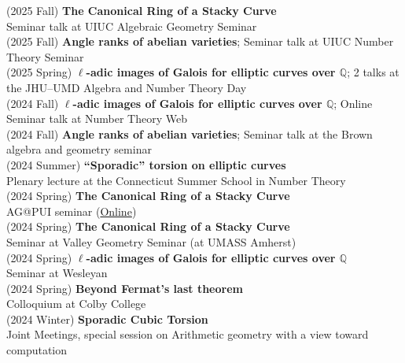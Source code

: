 \documentclass[margin,line]{res}
\begin{document}
\begin{resume}
(2025 Fall) \textbf{The Canonical Ring of a Stacky Curve}\\
Seminar talk at UIUC Algebraic Geometry Seminar
\vspace{.05cm}\\    
(2025 Fall) \textbf{Angle ranks of abelian varieties};
Seminar talk at UIUC Number Theory Seminar
\vspace{.05cm}\\
(2025 Spring) \textbf{$\ell$-adic images of Galois for elliptic curves over $\mathbb{Q}$};
2 talks at the JHU–UMD Algebra and Number Theory Day
\vspace{.05cm}\\  
(2024 Fall) \textbf{$\ell$-adic images of Galois for elliptic curves over $\mathbb{Q}$};
Online Seminar talk at Number Theory Web
\vspace{.05cm}\\  
(2024 Fall) \textbf{Angle ranks of abelian varieties};
Seminar talk at the Brown algebra and geometry seminar
\vspace{.05cm}\\
  (2024 Summer) \textbf{“Sporadic” torsion on elliptic curves}\\
Plenary lecture at the Connecticut Summer School in Number Theory
\vspace{.05cm}\\    
(2024 Spring) \textbf{The Canonical Ring of a Stacky Curve}\\
AG@PUI seminar (\href{https://sites.google.com/fordham.edu/agatpui/home}{Online})
\vspace{.05cm}\\    
(2024 Spring) \textbf{The Canonical Ring of a Stacky Curve}\\
Seminar at Valley Geometry Seminar (at UMASS Amherst)
\vspace{.05cm}\\  
(2024 Spring) \textbf{$\ell$-adic images of Galois for elliptic curves over $\mathbb{Q}$}\\
Seminar at Wesleyan
\vspace{.05cm}\\  
(2024 Spring) \textbf{Beyond Fermat's last theorem}\\
Colloquium at Colby College
\vspace{.05cm}\\  
(2024 Winter) \textbf{Sporadic Cubic Torsion}\\
Joint Meetings, special session on Arithmetic geometry with a view toward computation
\vspace{.05cm}\\  

\end{resume}
\end{document}
